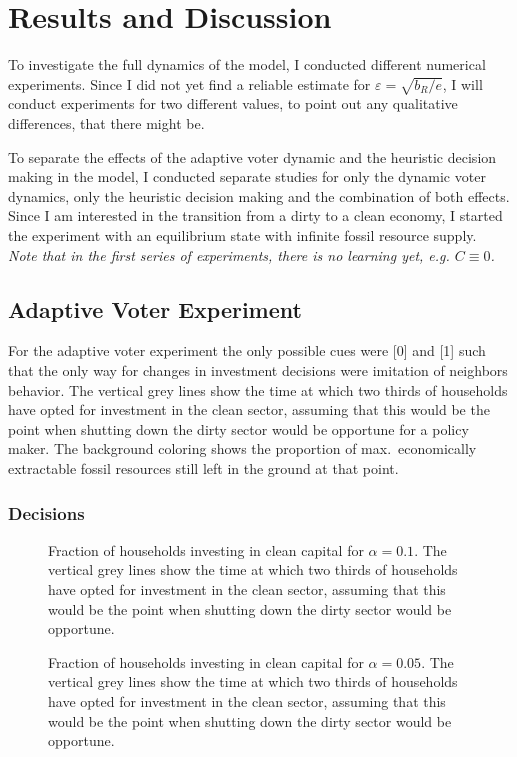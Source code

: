 \newpage


\section{Results and Discussion}  

To investigate the full dynamics of the model, I conducted different numerical experiments. Since I did not yet find a reliable estimate for $\varepsilon = \sqrt{b_R/e}$, I will conduct experiments for two different values, to point out any qualitative differences, that there might be.

To separate the effects of the adaptive voter dynamic and the heuristic decision making in the model, I conducted separate studies for only the dynamic voter dynamics, only the heuristic decision making and the combination of both effects. \\
Since I am interested in the transition from a dirty to a clean economy, I started the experiment with an equilibrium state with infinite fossil resource supply.\\

\textit{Note that in the first series of experiments, there is no learning yet, e.g. $C \equiv 0$.}

\subsection{Adaptive Voter Experiment}
For the adaptive voter experiment the only possible cues were [0] and [1] such that the only way for changes in investment decisions were imitation of neighbors behavior.
The vertical grey lines show the time at which two thirds of households have opted for investment in the clean sector, assuming that this would be the point when shutting down the dirty sector would be opportune for a policy maker. The background coloring shows the proportion of max.\ economically extractable fossil resources still left in the ground at that point.
\subsubsection{Decisions}
\begin{figure}[t]
	\centering
	\caption{Fraction of households investing in clean capital for $\alpha=0.1$. The vertical grey lines show the time at which two thirds of households have opted for investment in the clean sector, assuming that this would be the point when shutting down the dirty sector would be opportune. }
\end{figure}
\begin{figure}[t]
	\centering
	\caption{Fraction of households investing in clean capital for $\alpha=0.05$. The vertical grey lines show the time at which two thirds of households have opted for investment in the clean sector, assuming that this would be the point when shutting down the dirty sector would be opportune. }

\end{figure}
